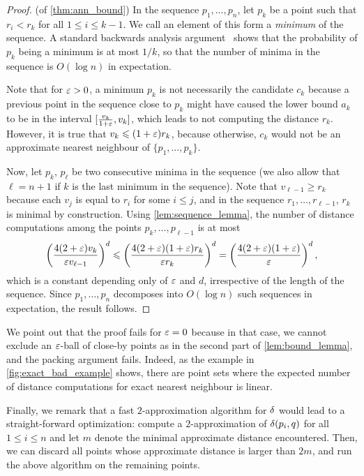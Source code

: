 \begin{proof} (of \cref{thm:ann_bound})
%
In the sequence $p_1,\ldots,p_n$, let $p_k$ be a point 
such that $r_i<r_k$ for all $1\leq i\leq k-1$. We call an element
of this form a \emph{minimum} of the sequence. 
A standard backwards analysis argument~\cite{seidel-backwards} shows that the probability
of $p_k$ being a minimum is at most $1/k$, so that the number of minima
in the sequence is $O(\log n)$ in expectation.

Note that for $\varepsilon>0$,
a minimum $p_k$ is not necessarily the candidate $c_k$ because a previous point
in the sequence close to $p_k$ might have caused the lower bound $a_k$ to be
in the interval $[\frac{v_k}{1+\varepsilon},v_k]$, which leads to not
computing the distance $r_k$. However, it is true that
$v_k\leqslant (1+\varepsilon)r_k$, because otherwise, $c_k$ would not be an approximate
nearest neighbour of $\{p_1,\ldots,p_k\}$.

Now, let $p_k$, $p_\ell$ be two consecutive minima in the sequence
(we also allow that $\ell=n+1$ if $k$ is the last minimum in the sequence).
Note that $v_{\ell-1}\geq r_k$ because each $v_j$ is equal to $r_i$ for
some $i\leq j$, and in the sequence $r_1,\ldots,r_{\ell-1}$, $r_k$
is minimal by construction. Using \cref{lem:sequence_lemma},
the number of distance computations among the points
$p_k,\ldots,p_{\ell-1}$ is at most
\[
\left(\frac{4(2+\varepsilon) v_k}{\varepsilon v_{\ell-1}}\right)^{d}\leqslant \left(\frac{4(2+\varepsilon)(1+\varepsilon)r_k}{\varepsilon r_k}\right)^{d}=\left(\frac{4(2+\varepsilon)(1+\varepsilon)}{\varepsilon}\right)^{d},\]
which is a constant depending only of $\varepsilon$ and $d$, irrespective of the length of the sequence.
Since $p_1,\ldots,p_n$ decomposes into $O(\log n)$ such sequences in expectation, the result follows.
\end{proof}

We point out that the proof fails for $\varepsilon=0$ because in that case, we cannot exclude an $\varepsilon$-ball
of close-by points as in the second part of \cref{lem:bound_lemma}, and the packing argument fails.
Indeed, as the example in \cref{fig:exact_bad_example} shows, there are point sets where the expected number
of distance computations for exact nearest neighbour is linear.



Finally, we remark that a fast $2$-approximation algorithm for $\delta$ would lead to a straight-forward
optimization: compute a $2$-approximation of $\delta(p_i,q)$ for all $1\leq i\leq n$
and let $m$ denote the minimal approximate distance encountered. Then, we can discard all points
whose approximate distance is larger than $2m$, and run the above algorithm on the remaining points.



